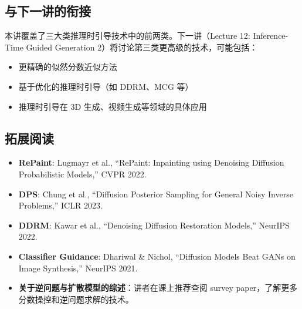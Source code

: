 \subsection{与下一讲的衔接}

本讲覆盖了三大类推理时引导技术中的前两类。下一讲（Lecture 12: Inference-Time Guided Generation 2）将讨论第三类更高级的技术，可能包括：
\begin{itemize}
    \item 更精确的似然分数近似方法
    \item 基于优化的推理时引导（如 DDRM、MCG 等）
    \item 推理时引导在 3D 生成、视频生成等领域的具体应用
\end{itemize}

\subsection{拓展阅读}

\begin{itemize}
    \item \textbf{RePaint}: Lugmayr et al., ``RePaint: Inpainting using Denoising Diffusion Probabilistic Models,'' CVPR 2022.
    \item \textbf{DPS}: Chung et al., ``Diffusion Posterior Sampling for General Noisy Inverse Problems,'' ICLR 2023.
    \item \textbf{DDRM}: Kawar et al., ``Denoising Diffusion Restoration Models,'' NeurIPS 2022.
    \item \textbf{Classifier Guidance}: Dhariwal \& Nichol, ``Diffusion Models Beat GANs on Image Synthesis,'' NeurIPS 2021.
    \item \textbf{关于逆问题与扩散模型的综述}：讲者在课上推荐查阅 survey paper，了解更多分数操控和逆问题求解的技术。
\end{itemize}



